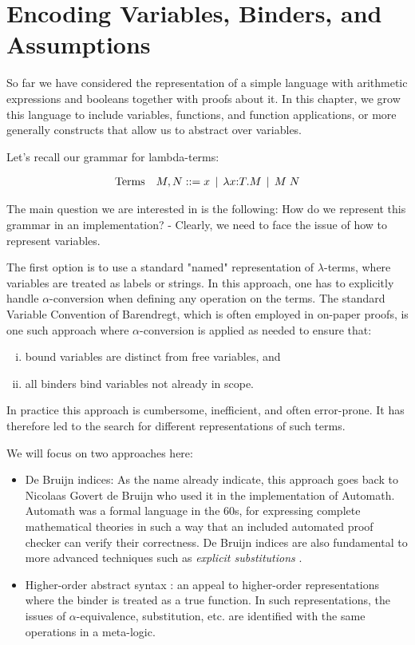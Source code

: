\chapter{Encoding Variables, Binders, and Assumptions}
\label{chap:binders}
So far we have considered the representation of a simple language with
arithmetic expressions and booleans together with proofs about it. In this
chapter, we grow this language to include variables, functions, and function applications,
or more generally constructs that allow us to abstract over variables.

Let's recall our grammar for lambda-terms:

\[
\begin{array}{ll@{\bnfas}l}
\mbox{Terms} & M, N & x \bnfalt \lam x{:}T.M \bnfalt M \app N
\end{array}
\]

The main question we are interested in is the following: How do we
represent this grammar in an implementation? - Clearly, we need to
face the issue of how to represent variables.

The first option is to use a standard "named" representation of
$\lambda$-terms, where variables are treated as labels or strings. In
this approach, one has to explicitly handle $\alpha$-conversion when
defining any operation on the terms. The standard Variable Convention
of Barendregt, which is often employed in on-paper proofs, is one such
approach where $\alpha$-conversion is applied as needed to ensure
that:

\begin{enumerate}[(i)]
\item bound variables are distinct from free variables, and
\item all binders bind variables not already in scope.
\end{enumerate}

In practice this approach is cumbersome, inefficient, and often error-prone. It
has therefore led to the search for different representations of such terms.

We will focus on two approaches here:

\begin{itemize}
\item De Bruijn indices: As the name already indicate, this approach
  goes back to Nicolaas Govert de Bruijn who used it in the
  implementation of Automath. Automath was a formal language in the
  60s, for expressing complete mathematical theories in such a way
  that an included automated proof checker can verify their
  correctness. De Bruijn indices are also fundamental to more advanced
  techniques such as \emph{explicit substitutions}
  \cite{Abadi:POPL90}.

\item Higher-order abstract syntax \cite{Pfenning88pldi}: an appeal to
  higher-order representations where the binder is treated as a true
  function. In such representations, the issues of
  $\alpha$-equivalence, substitution, etc. are identified with the
  same operations in a meta-logic.
\end{itemize}

